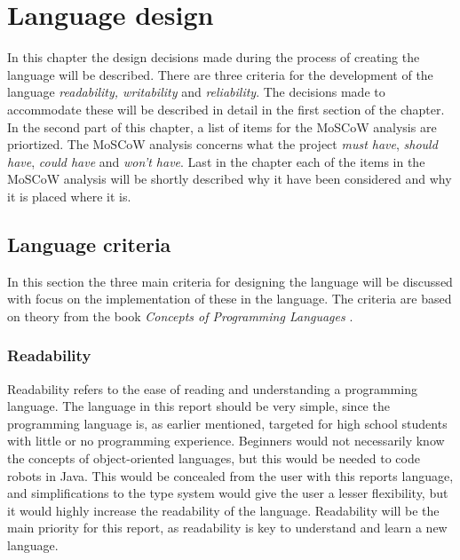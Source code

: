 \chapter{Language design}
\label{chap:LanguageDesign}
In this chapter the design decisions made during the process of creating the language will be described. There are three criteria for the development of the language \emph{readability, writability} and \emph{reliability}. The decisions made to accommodate these will be described in detail in the first section of the chapter. In the second part of this chapter, a list of items for the MoSCoW analysis are priortized. The MoSCoW analysis concerns what the project \textit{must have}, \textit{should have}, \textit{could have} and \textit{won't have}. Last in the chapter each of the  items in the MoSCoW analysis will be shortly described why it have been considered and why it is placed where it is.
 
\section{Language criteria}

In this section the three main criteria for designing the language will be discussed with focus on the implementation of these in the language. The criteria are based on theory from the book \emph{Concepts of Programming Languages} \citep{Sebesta}.

\subsection{Readability}
Readability refers to the ease of reading and understanding a programming language. The language in this report should be very simple, since the programming language is, as earlier mentioned, targeted for high school students with little or no programming experience. Beginners would not necessarily know the concepts of object-oriented languages, but this would be needed to code robots in Java. This would be concealed from the user with this reports language, and simplifications to the type system would give the user a lesser flexibility, but it would highly increase the readability of the language. Readability will be the main priority for this report, as readability is key to understand and learn a new language.

